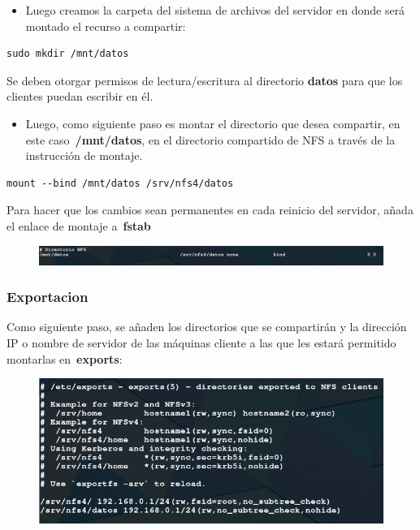 \documentclass[12pt]{extarticle}
\providecommand{\tightlist}{%
      \setlength{\itemsep}{0pt}\setlength{\parskip}{0pt}}
\begin{document}
\begin{itemize}
\tightlist
\item
  Luego creamos la carpeta del sistema de archivos del servidor en donde
  será montado el recurso a compartir:
\end{itemize}

\begin{verbatim}
sudo mkdir /mnt/datos
\end{verbatim}

Se deben otorgar permisos de lectura/escritura al directorio
\textbf{datos} para que los clientes puedan escribir en él.

\begin{itemize}
\tightlist
\item
  Luego, como siguiente paso es montar el directorio que desea
  compartir, en este caso~\textbf{/mnt/datos}, en el directorio
  compartido de NFS a través de la instrucción de montaje.
\end{itemize}

\begin{verbatim}
mount --bind /mnt/datos /srv/nfs4/datos
\end{verbatim}

Para hacer que los cambios sean permanentes en cada reinicio del
servidor, añada el enlace de montaje a~\textbf{fstab}

\begin{figure}[h]
\centering
\includegraphics{images/fstab.png}
\caption{}
\end{figure}

\subsubsection{Exportacion}\label{exportacion}

Como siguiente paso, se añaden los directorios que se compartirán y la
dirección IP o nombre de servidor de las máquinas cliente a las que les
estará permitido montarlas en~\textbf{exports}:

\begin{figure}[h]
\centering
\includegraphics{images/exports.png}
\caption{}
\end{figure}
\end{document}

